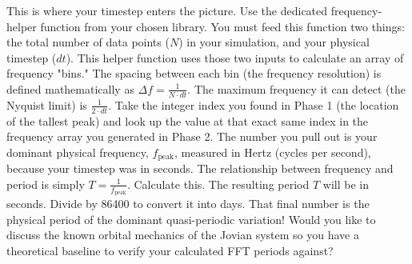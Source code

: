 {}This is where your timestep enters the picture.\markdownRendererInterblockSeparator
{}\markdownRendererOlBegin
{} Use the dedicated frequency-helper function from your chosen library. You must feed this function two things: the total number of data points ($N$) in your simulation, and your physical timestep ($dt$).\markdownRendererOlItemEnd 
{} This helper function uses those two inputs to calculate an array of frequency "bins." The spacing between each bin (the frequency resolution) is defined mathematically as $\Delta f = \frac{1}{N \cdot dt}$. The maximum frequency it can detect (the Nyquist limit) is $\frac{1}{2 \cdot dt}$.\markdownRendererOlItemEnd 
\markdownRendererOlEnd \markdownRendererInterblockSeparator
{}
\markdownRendererSectionEnd \markdownRendererSectionBegin
{}\markdownRendererInterblockSeparator
{}\markdownRendererOlBegin
{} Take the integer index you found in Phase 1 (the location of the tallest peak) and look up the value at that exact same index in the frequency array you generated in Phase 2.\markdownRendererOlItemEnd 
{} The number you pull out is your dominant physical frequency, $f_{\text{peak}}$, measured in Hertz (cycles per second), because your timestep was in seconds.\markdownRendererOlItemEnd 
{} The relationship between frequency and period is simply $T = \frac{1}{f_{\text{peak}}}$. Calculate this.\markdownRendererOlItemEnd 
{} The resulting period $T$ will be in seconds. Divide by 86400 to convert it into days.\markdownRendererOlItemEnd 
\markdownRendererOlEnd \markdownRendererInterblockSeparator
{}That final number is the physical period of the dominant quasi-periodic variation!\markdownRendererInterblockSeparator
{}Would you like to discuss the known orbital mechanics of the Jovian system so you have a theoretical baseline to verify your calculated FFT periods against?\markdownRendererInterblockSeparator
{}\markdownRendererThematicBreak{}\markdownRendererInterblockSeparator
{}
\markdownRendererSectionEnd 
\markdownRendererSectionEnd \markdownRendererSectionBegin
